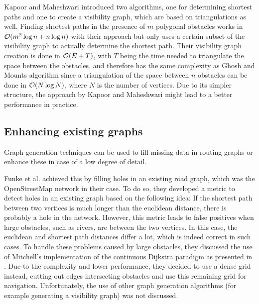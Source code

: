 		Kapoor and Maheshwari introduced two algorithms, one for determining shortest paths and one to create a visibility graph, which are based on triangulations as well\cite{kapoor-shortest-path-vgraph}.
		Finding shortest paths in the presence of $m$ polygonal obstacles works in $\mathcal{O}(m^2 \log{n} + n\log{n})$ with their approach but only uses a certain subset of the visibility graph to actually determine the shortest path.
		Their visibility graph creation is done in $\mathcal{O}(E+T)$, with $T$ being the time needed to triangulate the space between the obstacles, and therefore has the same complexity as Ghosh and Mounts algorithm since a triangulation of the space between $n$ obstacles can be done in $\mathcal{O}(N \log{N})$\cite{tereshchenko-triangulating-open-spaces}, where $N$ is the number of vertices.
		Due to its simpler structure, the approach by Kapoor and Maheshwari might lead to a better performance in practice.
		
		
	
	\subsection{Enhancing existing graphs}
	
		Graph generation techniques can be used to fill missing data in routing graphs or enhance these in case of a low degree of detail.
		
		Funke et al. achieved this by filling holes in an existing road graph, which was the OpenStreetMap network in their case\cite{funke-osm-extrapolation}.
		To do so, they developed a metric to detect holes in an existing graph based on the following idea:
		If the shortest path between two vertices is much longer than the euclidean distance, there is probably a hole in the network.
		However, this metric leads to false positives when large obstacles, such as rivers, are between the two vertices.
		In this case, the euclidean and shortest path distances differ a lot, which is indeed correct in such cases.
		To handle these problems caused by large obstacles, they discussed the use of Mitchell's implementation of the \hyperref[subsec:continuous-dijkstra]{continuous Dijkstra paradigm} as presented in .
		Due to the complexity and lower performance, they decided to use a dense grid instead, cutting out edges intersecting obstacles and use this remaining grid for navigation.
		Unfortunately, the use of other graph generation algorithms (for example generating a visibility graph) was not discussed.
		
